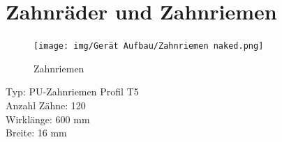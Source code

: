 

\section{Zahnräder und Zahnriemen}\label{sec:ZahnräderuZahnrad}













\begin{figure}[H]
  \texttt{[image: img/Gerät Aufbau/Zahnriemen naked.png]}
  \centering
  \caption{Zahnriemen}
  \label{fig:Zahnriemen}
\end{figure}

Typ: PU-Zahnriemen Profil T5\\

Anzahl Zähne: 120\\

Wirklänge: 600 mm \\

Breite: 16 mm
